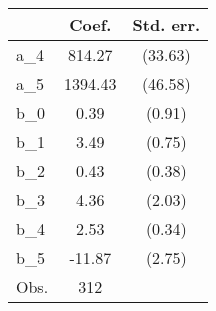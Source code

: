 {
\def\sym#1{\ifmmode^{#1}\else\(^{#1}\)\fi}
\begin{tabular}{l*{1}{cc}}
\hline\hline
                &    Coef.&Std. err.\\
\hline
a\_4             &   814.27&  (33.63)\\
a\_5             &  1394.43&  (46.58)\\
b\_0             &     0.39&   (0.91)\\
b\_1             &     3.49&   (0.75)\\
b\_2             &     0.43&   (0.38)\\
b\_3             &     4.36&   (2.03)\\
b\_4             &     2.53&   (0.34)\\
b\_5             &   -11.87&   (2.75)\\
\hline
Obs.            &      312&         \\
\hline\hline
\end{tabular}
}
